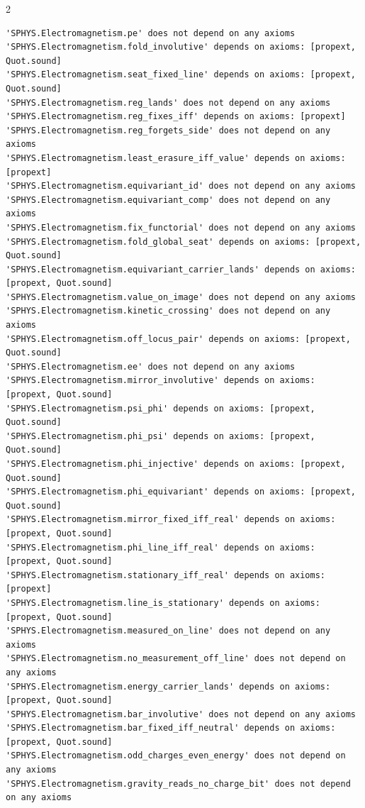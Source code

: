 \documentclass[10pt]{article}
\begin{document}
\begin{multicols}{2}
\begin{Verbatim}[fontsize=\fontsize{6.0}{6.9}\selectfont,breaklines,breakanywhere,breaksymbolleft={}]
'SPHYS.Electromagnetism.pe' does not depend on any axioms
'SPHYS.Electromagnetism.fold_involutive' depends on axioms: [propext, Quot.sound]
'SPHYS.Electromagnetism.seat_fixed_line' depends on axioms: [propext, Quot.sound]
'SPHYS.Electromagnetism.reg_lands' does not depend on any axioms
'SPHYS.Electromagnetism.reg_fixes_iff' depends on axioms: [propext]
'SPHYS.Electromagnetism.reg_forgets_side' does not depend on any axioms
'SPHYS.Electromagnetism.least_erasure_iff_value' depends on axioms: [propext]
'SPHYS.Electromagnetism.equivariant_id' does not depend on any axioms
'SPHYS.Electromagnetism.equivariant_comp' does not depend on any axioms
'SPHYS.Electromagnetism.fix_functorial' does not depend on any axioms
'SPHYS.Electromagnetism.fold_global_seat' depends on axioms: [propext, Quot.sound]
'SPHYS.Electromagnetism.equivariant_carrier_lands' depends on axioms: [propext, Quot.sound]
'SPHYS.Electromagnetism.value_on_image' does not depend on any axioms
'SPHYS.Electromagnetism.kinetic_crossing' does not depend on any axioms
'SPHYS.Electromagnetism.off_locus_pair' depends on axioms: [propext, Quot.sound]
'SPHYS.Electromagnetism.ee' does not depend on any axioms
'SPHYS.Electromagnetism.mirror_involutive' depends on axioms: [propext, Quot.sound]
'SPHYS.Electromagnetism.psi_phi' depends on axioms: [propext, Quot.sound]
'SPHYS.Electromagnetism.phi_psi' depends on axioms: [propext, Quot.sound]
'SPHYS.Electromagnetism.phi_injective' depends on axioms: [propext, Quot.sound]
'SPHYS.Electromagnetism.phi_equivariant' depends on axioms: [propext, Quot.sound]
'SPHYS.Electromagnetism.mirror_fixed_iff_real' depends on axioms: [propext, Quot.sound]
'SPHYS.Electromagnetism.phi_line_iff_real' depends on axioms: [propext, Quot.sound]
'SPHYS.Electromagnetism.stationary_iff_real' depends on axioms: [propext]
'SPHYS.Electromagnetism.line_is_stationary' depends on axioms: [propext, Quot.sound]
'SPHYS.Electromagnetism.measured_on_line' does not depend on any axioms
'SPHYS.Electromagnetism.no_measurement_off_line' does not depend on any axioms
'SPHYS.Electromagnetism.energy_carrier_lands' depends on axioms: [propext, Quot.sound]
'SPHYS.Electromagnetism.bar_involutive' does not depend on any axioms
'SPHYS.Electromagnetism.bar_fixed_iff_neutral' depends on axioms: [propext, Quot.sound]
'SPHYS.Electromagnetism.odd_charges_even_energy' does not depend on any axioms
'SPHYS.Electromagnetism.gravity_reads_no_charge_bit' does not depend on any axioms

\end{Verbatim}
\end{multicols}
\end{document}
